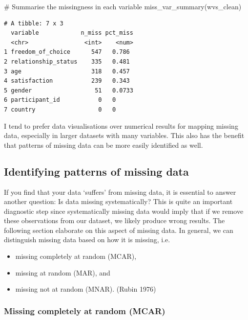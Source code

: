 \documentclass[
  letterpaper,
]{krantz}
\makeatletter
\newenvironment{Shaded}{\begin{snugshade}}{\end{snugshade}}
\newcommand{\CommentTok}[1]{\textcolor[rgb]{0.37,0.37,0.37}{#1}}
\newcommand{\FunctionTok}[1]{\textcolor[rgb]{0.28,0.35,0.67}{#1}}
\newcommand{\NormalTok}[1]{\textcolor[rgb]{0.00,0.23,0.31}{#1}}
\newenvironment{kframe}{%
\medskip{}
\setlength{\fboxsep}{.8em}
 \def\at@end@of@kframe{}%
 \ifinner\ifhmode%
  \def\at@end@of@kframe{\end{minipage}}%
  \begin{minipage}{\columnwidth}%
 \fi\fi%
 \def\FrameCommand##1{\hskip\@totalleftmargin \hskip-\fboxsep
 \colorbox{shadecolor}{##1}\hskip-\fboxsep
     \hskip-\linewidth \hskip-\@totalleftmargin \hskip\columnwidth}%
 \MakeFramed {\advance\hsize-\width
   \@totalleftmargin\z@ \linewidth\hsize
   \@setminipage}}%
 {\par\unskip\endMakeFramed%
 \at@end@of@kframe}
\renewenvironment{Shaded}{\begin{kframe}}{\end{kframe}}
\makeatother
\begin{document}
\begin{Shaded}
\begin{Highlighting}[]
\CommentTok{\# Summarise the missingness in each variable}
\FunctionTok{miss\_var\_summary}\NormalTok{(wvs\_clean)}
\end{Highlighting}
\end{Shaded}

\begin{verbatim}
# A tibble: 7 x 3
  variable            n_miss pct_miss
  <chr>                <int>    <num>
1 freedom_of_choice      547   0.786 
2 relationship_status    335   0.481 
3 age                    318   0.457 
4 satisfaction           239   0.343 
5 gender                  51   0.0733
6 participant_id           0   0     
7 country                  0   0     
\end{verbatim}

I tend to prefer data visualisations over numerical results for mapping
missing data, especially in larger datasets with many variables. This
also has the benefit that patterns of missing data can be more easily
identified as well.

\subsection{Identifying patterns of missing
data}\label{sec-patterns-of-missing-data}

If you find that your data `suffers' from missing data, it is essential
to answer another question: Is data missing systematically? This is
quite an important diagnostic step since systematically missing data
would imply that if we remove these observations from our dataset, we
likely produce wrong results. The following section elaborate on this
aspect of missing data. In general, we can distinguish missing data
based on how it is missing, i.e.

\begin{itemize}
\item
  missing completely at random (MCAR),
\item
  missing at random (MAR), and
\item
  missing not at random (MNAR). (Rubin 1976)
\end{itemize}

\subsubsection{Missing completely at random
(MCAR)}\label{sec-missing-completetly-at-random-mcar}
\end{document}
